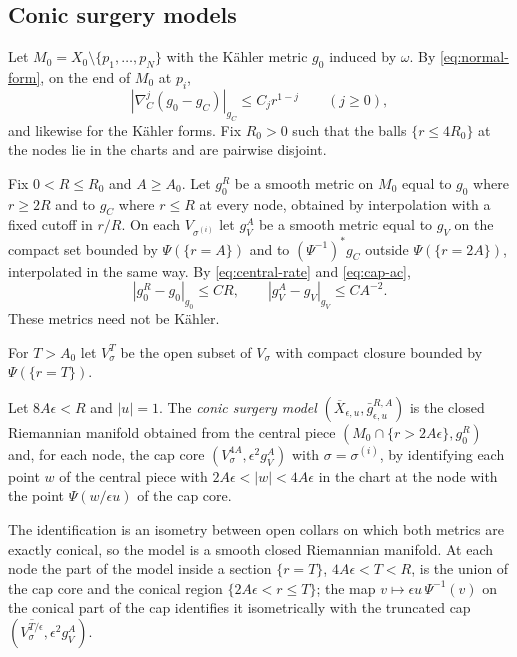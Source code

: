 \subsection{Conic surgery models}\label{sec:models}
Let $M_0=X_0\setminus\{p_1,\ldots,p_N\}$ with the K\"ahler metric $g_0$
induced by $\omega$. By \eqref{eq:normal-form}, on the end of $M_0$ at
$p_i$,
\begin{equation}\label{eq:central-rate}
 |\nabla_C^j(g_0-g_C)|_{g_C}\le C_jr^{1-j}\qquad(j\ge0),
\end{equation}
and likewise for the K\"ahler forms. Fix $R_0>0$ such that the balls
$\{r\le4R_0\}$ at the nodes lie in the charts and are pairwise disjoint.

Fix $0<R\le R_0$ and $A\ge A_0$. Let $g_0^R$ be a smooth metric on $M_0$
equal to $g_0$ where $r\ge2R$ and to $g_C$ where $r\le R$ at every node,
obtained by interpolation with a fixed cutoff in $r/R$. On each
$V_{\sigma^{(i)}}$ let $g_V^A$ be a smooth metric equal to $g_V$ on the
compact set bounded by $\Psi(\{r=A\})$ and to $(\Psi^{-1})^*g_C$ outside
$\Psi(\{r=2A\})$, interpolated in the same way. By \eqref{eq:central-rate}
and \eqref{eq:cap-ac},
\begin{equation}\label{eq:interpolation-errors}
 |g_0^R-g_0|_{g_0}\le CR,\qquad |g_V^A-g_V|_{g_V}\le CA^{-2}.
\end{equation}
These metrics need not be K\"ahler.

For $T>A_0$ let $V_\sigma^{T}$ be the open subset of $V_\sigma$ with
compact closure bounded by $\Psi(\{r=T\})$.

\begin{definition}\label{def:model}
Let $8A\epsilon<R$ and $|u|=1$. The \emph{conic surgery model}
$(\overline X_{\epsilon,u},\bar g_{\epsilon,u}^{R,A})$ is the closed
Riemannian manifold obtained from the central piece
$(M_0\cap\{r>2A\epsilon\},g_0^R)$ and, for each node, the cap core
$(V_{\sigma}^{4A},\epsilon^2g_V^A)$ with $\sigma=\sigma^{(i)}$, by
identifying each point $w$ of the central piece with
$2A\epsilon<|w|<4A\epsilon$ in the chart at the node with the point
$\Psi(w/\epsilon u)$ of the cap core.
\end{definition}

The identification is an isometry between open collars on which both
metrics are exactly conical, so the model is a smooth closed Riemannian
manifold. At each node the part of the model inside a section
$\{r=T\}$, $4A\epsilon<T<R$, is the union of the cap core and the
conical region $\{2A\epsilon<r\le T\}$; the map
$v\mapsto\epsilon u\,\Psi^{-1}(v)$ on the conical part of the cap
identifies it isometrically with the truncated cap
$(\overline{V_\sigma^{T/\epsilon}},\epsilon^2g_V^A)$.

